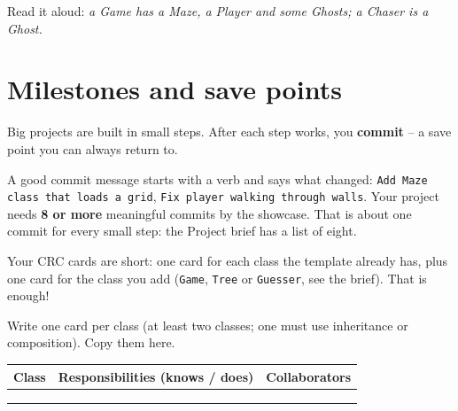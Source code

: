 Read it aloud: \emph{a Game has a Maze, a Player and some Ghosts; a Chaser is a Ghost.}

\section{Milestones and save points}
Big projects are built in small steps. After each step works, you \textbf{commit} -- a save point you can always return to.
\begin{center}
\end{center}
A good commit message starts with a verb and says what changed: \texttt{Add Maze class that loads a grid}, \texttt{Fix player walking through walls}. Your project needs \textbf{8 or more} meaningful commits by the showcase. That is about one commit for every small step: the Project brief has a list of eight.

\begin{tip}
Your CRC cards are short: one card for each class the template already has, plus one card for the class you add (\texttt{Game}, \texttt{Tree} or \texttt{Guesser}, see the brief). That is enough!
\end{tip}

\begin{exercise}
Write one card per class (at least two classes; one must use inheritance or composition). Copy them here.
\begin{center}\small
\begin{tabular}{|p{3cm}|p{6.6cm}|p{4cm}|}
\hline
\textbf{Class} & \textbf{Responsibilities} (knows / does) & \textbf{Collaborators}\\ \hline
 & & \\[1.2cm] \hline
 & & \\[1.2cm] \hline
 & & \\[1.2cm] \hline
\end{tabular}
\end{center}
\end{exercise}

